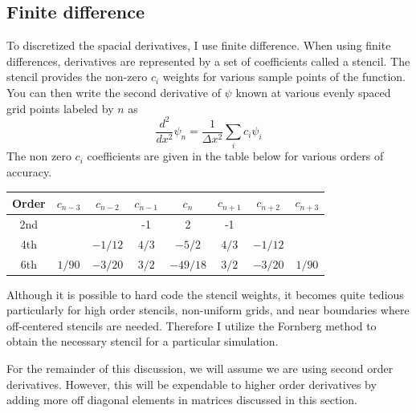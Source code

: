 \subsection{Finite difference} %
\label{sub:finite_difference}
To discretized the spacial derivatives, I use finite difference. When using finite differences, derivatives are represented by a set of coefficients called a stencil. The stencil provides the non-zero $c_i$ weights for various sample points of the function. You can then write the second derivative of $\psi$ known at various evenly spaced grid points labeled by $n$ as
\begin{equation}
    \frac{d^2}{dx^2}\psi_n = \frac{1}{\Delta x^2}\sum_i c_i \psi_i
    \label{eq:finite_diff}
\end{equation}
The non zero $c_i$ coefficients are given in the table below for various orders of accuracy.
\begin{center}
\begin{tabular}{ |c|c|c|c|c|c|c|c| }
\hline
Order & $c_{n-3}$ & $c_{n-2}$ & $c_{n-1}$ & $c_{n}$ & $c_{n+1}$ & $c_{n+2}$ & $c_{n+3}$ \\ \hline
2nd   &      &      & -1   & 2  & -1   &      &      \\ \hline
4th   &      & $-1/12$ & $4/3$   & $-5/2$  & $4/3$   &  $-1/12$    &      \\ \hline
6th   &   $1/90$   &  $-3/20$    & $3/2$   & $-49/18$  & $3/2$   &   $-3/20$    &   $1/90$  \\ \hline
\end{tabular}
\end{center}

Although it is possible to hard code the stencil weights, it becomes quite tedious particularly for high order stencils, non-uniform grids, and near boundaries where off-centered stencils are needed. Therefore I utilize the Fornberg method \cite{Fornberg1988} to obtain the necessary stencil for a particular simulation. 

For the remainder of this discussion, we will assume we are using second order derivatives. However, this will be expendable to higher order derivatives by adding more off diagonal elements in matrices discussed in this section. 

